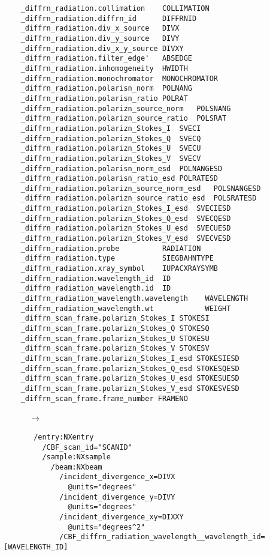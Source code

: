 \documentclass[11pt]{article}
\begin{document}
{{{\begin{verbatim}     
    _diffrn_radiation.collimation    COLLIMATION
    _diffrn_radiation.diffrn_id      DIFFRNID
    _diffrn_radiation.div_x_source   DIVX
    _diffrn_radiation.div_y_source   DIVY
    _diffrn_radiation.div_x_y_source DIVXY
    _diffrn_radiation.filter_edge'   ABSEDGE
    _diffrn_radiation.inhomogeneity  HWIDTH
    _diffrn_radiation.monochromator  MONOCHROMATOR
    _diffrn_radiation.polarisn_norm  POLNANG
    _diffrn_radiation.polarisn_ratio POLRAT
    _diffrn_radiation.polarizn_source_norm   POLSNANG
    _diffrn_radiation.polarizn_source_ratio  POLSRAT
    _diffrn_radiation.polarizn_Stokes_I  SVECI
    _diffrn_radiation.polarizn_Stokes_Q  SVECQ
    _diffrn_radiation.polarizn_Stokes_U  SVECU
    _diffrn_radiation.polarizn_Stokes_V  SVECV
    _diffrn_radiation.polarisn_norm_esd  POLNANGESD
    _diffrn_radiation.polarisn_ratio_esd POLRATESD
    _diffrn_radiation.polarizn_source_norm_esd   POLSNANGESD
    _diffrn_radiation.polarizn_source_ratio_esd  POLSRATESD
    _diffrn_radiation.polarizn_Stokes_I_esd  SVECIESD
    _diffrn_radiation.polarizn_Stokes_Q_esd  SVECQESD
    _diffrn_radiation.polarizn_Stokes_U_esd  SVECUESD
    _diffrn_radiation.polarizn_Stokes_V_esd  SVECVESD
    _diffrn_radiation.probe          RADIATION
    _diffrn_radiation.type           SIEGBAHNTYPE
    _diffrn_radiation.xray_symbol    IUPACXRAYSYMB
    _diffrn_radiation.wavelength_id  ID
    _diffrn_radiation_wavelength.id  ID
    _diffrn_radiation_wavelength.wavelength    WAVELENGTH
    _diffrn_radiation_wavelength.wt            WEIGHT
    _diffrn_scan_frame.polarizn_Stokes_I STOKESI
    _diffrn_scan_frame.polarizn_Stokes_Q STOKESQ
    _diffrn_scan_frame.polarizn_Stokes_U STOKESU
    _diffrn_scan_frame.polarizn_Stokes_V STOKESV
    _diffrn_scan_frame.polarizn_Stokes_I_esd STOKESIESD
    _diffrn_scan_frame.polarizn_Stokes_Q_esd STOKESQESD
    _diffrn_scan_frame.polarizn_Stokes_U_esd STOKESUESD
    _diffrn_scan_frame.polarizn_Stokes_V_esd STOKESVESD
    _diffrn_scan_frame.frame_number FRAMENO
\end{verbatim}
~~~~~~{\bf{}$\rightarrow$}\\
\begin{verbatim}
       /entry:NXentry
         /CBF_scan_id="SCANID"
         /sample:NXsample
           /beam:NXbeam
             /incident_divergence_x=DIVX
               @units="degrees"
             /incident_divergence_y=DIVY
               @units="degrees"
             /incident_divergence_xy=DIXXY
               @units="degrees^2"
             /CBF_diffrn_radiation_wavelength__wavelength_id=[WAVELENGTH_ID]

\end{verbatim}}}}
\end{document}
